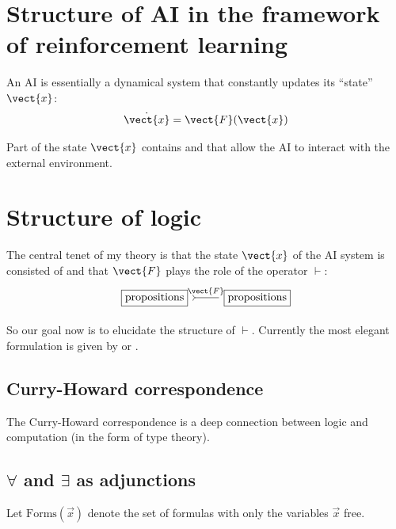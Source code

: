 \tableofcontents


\section{Structure of AI in the framework of reinforcement learning}

An AI is essentially a dynamical system that constantly updates its ``state'' $\vect{x}$:
\begin{equation}
\dot{\vect{x}} = \vect{F}(\vect{x})
\end{equation}

Part of the state $\vect{x}$ contains  and  that allow the AI to interact with the external environment.



\section{Structure of logic}

The central tenet of my theory is that the state $\vect{x}$ of the AI system is consisted of  and that $\vect{F}$ plays the role of the  operator $\vdash$:
\begin{equation}
\begin{tikzcd}
\boxed{\mbox{propositions}}
\arrow[r, tail, no head, "\vect{F}"]
& \boxed{\mbox{propositions}}
\end{tikzcd}
\end{equation}

So our goal now is to elucidate the structure of $\vdash$.  Currently the most elegant formulation is given by  or .


\subsection{Curry-Howard correspondence}

The Curry-Howard correspondence is a deep connection between logic and computation (in the form of type theory).



\subsection{$\forall$ and $\exists$ as adjunctions}

Let $\mbox{Forms}(\vec{x})$ denote the set of formulas with only the variables $\vec{x}$ free.

